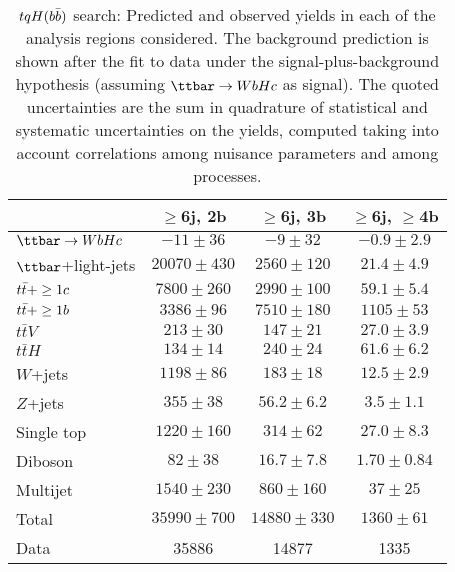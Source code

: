 \begin{table}[htbp]
\begin{center}
\begin{tabular}{l*{3}{c}}
\hline\hline
 & $\geq$6j, 2b & $\geq$6j, 3b & $\geq$6j, $\geq$4b \\
\hline
$\Hc$  &   $ -11 \pm 36 $ &   $ -9 \pm 32 $ &   $ -0.9 \pm 2.9 $ \\ 
\hline
$\ttbar$+light-jets  &   $ 20070 \pm 430 $ &   $ 2560 \pm 120 $ &   $ 21.4 \pm 4.9 $ \\ 
$t\bar{t}+\geq1c$  &   $ 7800 \pm 260 $ &   $ 2990 \pm 100 $ &   $ 59.1 \pm 5.4 $ \\ 
$t\bar{t}+\geq1b$  &   $ 3386 \pm 96 $ &   $ 7510 \pm 180 $ &   $ 1105 \pm 53 $ \\ 
$t\bar{t}V$  &   $ 213 \pm 30 $ &   $ 147 \pm 21 $ &   $ 27.0 \pm 3.9 $ \\ 
$t\bar{t}H$  &   $ 134 \pm 14 $ &   $ 240 \pm 24 $ &   $ 61.6 \pm 6.2 $ \\ 
$W$+jets  &   $ 1198 \pm 86 $ &   $ 183 \pm 18 $ &   $ 12.5 \pm 2.9 $ \\ 
$Z$+jets  &   $ 355 \pm 38 $ &   $ 56.2 \pm 6.2 $ &   $ 3.5 \pm 1.1 $ \\ 
Single top  &   $ 1220 \pm 160 $ &   $ 314 \pm 62 $ &   $ 27.0 \pm 8.3 $ \\ 
Diboson  &   $ 82 \pm 38 $ &   $ 16.7 \pm 7.8 $ &   $ 1.70 \pm 0.84 $ \\ 
Multijet  &   $ 1540 \pm 230 $ &   $ 860 \pm 160 $ &   $ 37 \pm 25 $ \\ 
\hline
Total & $ 35990 \pm 700 $ &   $ 14880 \pm 330 $ &   $ 1360 \pm 61 $ \\ 
\hline
Data & 35886  & 14877  & 1335  \\
\hline\hline      
\end{tabular}

%
\end{center}
\caption{
$tqH(b\bar{b})$ search: Predicted and observed yields in each of the analysis regions considered.
The background prediction is shown after the fit to data under the signal-plus-background hypothesis 
(assuming $\Hc$ as signal).
The quoted uncertainties are the sum in quadrature of statistical and systematic uncertainties on the yields, 
computed taking into account correlations among nuisance parameters and among processes.
}
\label{tab:Hbb_Postfit_Yields_Unblind_Hc}
\end{table}

